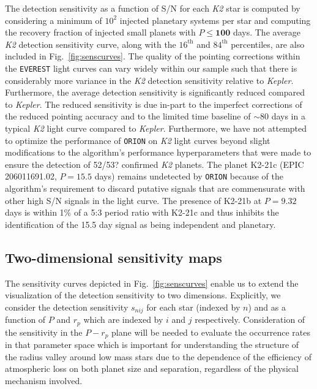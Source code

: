 \documentclass[twocolumn]{emulateapj}
\newcommand{\kepler}[1]{\emph{Kepler}#1}
\newcommand{\ktwo}[1]{\emph{K2}#1}
\begin{document}
The detection sensitivity as a function of S/N for each \ktwo{} star is computed by considering a minimum of
$10^2$ injected planetary systems per star and computing the recovery fraction of injected small planets with
$P \leq \textbf{100}$ days. The average \ktwo{} detection sensitivity curve, along with the
$16^{\text{th}}$ and $84^{\text{th}}$ percentiles, are also included in Fig.~\ref{fig:senscurves}. The quality
of the pointing corrections within the \texttt{EVEREST} light curves can vary widely within our sample such
that there is considerably more variance in the \ktwo{} detection sensitivity relative to \kepler{.} Furthermore,
the average detection sensitivity is significantly reduced compared to \kepler{.} %
The reduced sensitivity is due in-part to the imperfect corrections of the reduced pointing accuracy and
to the limited time baseline of $\sim 80$ days in a typical \ktwo{} light curve compared to \kepler{.} 
Furthermore, we have not attempted to optimize the performance of \texttt{ORION} on \ktwo{} light curves 
beyond slight modifications to the algorithm's performance hyperparameters that were made to ensure the
detection of 52/53? confirmed \ktwo{} planets. The planet K2-21c (EPIC 206011691.02, $P=15.5$ days)
remains undetected by \texttt{ORION} because of the algorithm's requirement to discard putative signals
that are commensurate with other high S/N signals in the light curve. The presence of K2-21b at $P=9.32$ days
is within 1\% of a 5:3 period ratio with K2-21c and thus inhibits the identification of the 15.5 day signal
as being independent and planetary.


\subsection{Two-dimensional sensitivity maps}
The sensitivity curves depicted in Fig.~\ref{fig:senscurves} enable us to extend the visualization of the
detection sensitivity to two dimensions. Explicitly, we consider the detection sensitivity
$s_{nij}$ for each star (indexed by $n$) and as a function of $P$ and $r_p$ which are indexed by $i$ and
$j$ respectively. Consideration of the sensitivity in the $P-r_p$ plane will be needed to evaluate the
occurrence rates in that parameter space which is important for understanding the structure of
the radius valley around low mass stars due to the dependence of the efficiency of atmospheric loss on
both planet size and separation, regardless of the physical mechanism involved. 
\end{document}
